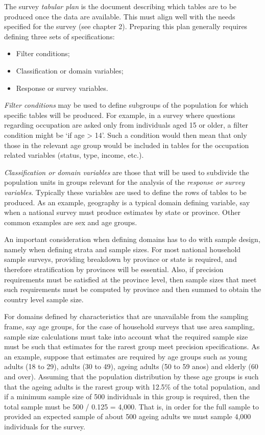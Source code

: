 \documentclass[
  12pt,
]{book}
\begin{document}
The survey \emph{tabular plan} is the document describing which tables are to be produced once the data are available. This must align well with the needs specified for the survey (see chapter 2). Preparing this plan generally requires defining three sets of specifications:

\begin{itemize}
\item
  Filter conditions;
\item
  Classification or domain variables;
\item
  Response or survey variables.
\end{itemize}

\emph{Filter conditions} may be used to define subgroups of the population for which specific tables will be produced. For example, in a survey where questions regarding occupation are asked only from individuals aged 15 or older, a filter condition might be `if age \textgreater{} 14'. Such a condition would then mean that only those in the relevant age group would be included in tables for the occupation related variables (status, type, income, etc.).

\emph{Classification or domain variables} are those that will be used to subdivide the population units in groups relevant for the analysis of the \emph{response or survey variables}. Typically these variables are used to define the rows of tables to be produced. As an example, geography is a typical domain defining variable, say when a national survey must produce estimates by state or province. Other common examples are sex and age groups.

An important consideration when defining domains has to do with sample design, namely when defining strata and sample sizes. For most national household sample surveys, providing breakdown by province or state is required, and therefore stratification by provinces will be essential. Also, if precision requirements must be satisfied at the province level, then sample sizes that meet such requirements must be computed by province and then summed to obtain the country level sample size.

For domains defined by characteristics that are unavailable from the sampling frame, say age groups, for the case of household surveys that use area sampling, sample size calculations must take into account what the required sample size must be such that estimates for the rarest group meet precision specifications. As an example, suppose that estimates are required by age groups such as young adults (18 to 29), adults (30 to 49), ageing adults (50 to 59 anos) and elderly (60 and over). Assuming that the population distribution by these age groups is such that the ageing adults is the rarest group with 12.5\% of the total population, and if a minimum sample size of 500 individuals in this group is required, then the total sample must be 500 / 0.125 = 4,000. That is, in order for the full sample to provided an expected sample of about 500 ageing adults we must sample 4,000 individuals for the survey.
\end{document}
